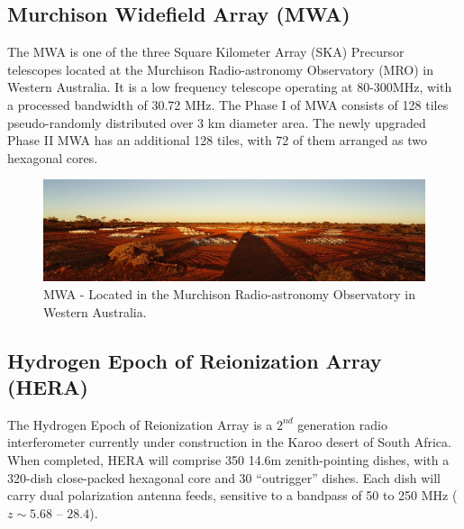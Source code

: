 \documentclass[a0,landscape]{a0poster}
\begin{document}
\begin{multicols}{4}
\subsection*{Murchison Widefield Array (MWA)}

The MWA is one of the three Square Kilometer Array (SKA) Precursor telescopes located at the Murchison Radio-astronomy Observatory (MRO) in Western Australia. It is a low frequency telescope operating at 80-300MHz, with a processed bandwidth of 30.72 MHz. The Phase I of MWA consists of 128 tiles pseudo-randomly distributed over 3 km diameter area. The newly upgraded Phase II MWA has an additional 128 tiles, with 72 of them arranged as two hexagonal cores.
\begin{figure}[H]
\centering
\label{fig:HERA}
\includegraphics[width=0.95\linewidth]{figures/MWA_tiles.jpg}
\caption{MWA - Located in the Murchison Radio-astronomy Observatory in Western Australia.}
\end{figure}


\subsection*{Hydrogen Epoch of Reionization Array (HERA)}

The Hydrogen Epoch of Reionization Array is a $2^{nd}$ generation radio interferometer currently under construction in the Karoo desert of South Africa. When completed, HERA will comprise 350 14.6m zenith-pointing dishes, with a 320-dish close-packed hexagonal core and 30 ``outrigger'' dishes. Each dish will carry dual polarization antenna feeds, sensitive to a bandpass of 50 to 250 MHz ($z \sim 5.68$ -- $28.4$).


\end{multicols}
\end{document}
